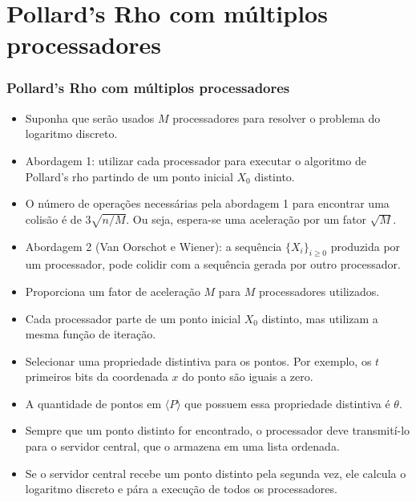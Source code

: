 \documentclass{beamer}
\begin{document}
\section{Pollard's Rho com múltiplos processadores}
\begin{frame}
\frametitle{Pollard's Rho com múltiplos processadores}
  \begin{itemize}
    \item Suponha que serão usados $M$ processadores para resolver o problema do logaritmo discreto.
    \item Abordagem 1: utilizar cada processador para executar o algoritmo de Pollard's rho partindo de um ponto inicial $X_0$ distinto.
    \item O número de operações necessárias pela abordagem 1 para encontrar uma colisão é de $3\sqrt{n/M}$. Ou seja, espera-se uma aceleração por um fator $\sqrt{M}$.
  \end{itemize}
\end{frame}
\begin{frame}
  \begin{itemize}
    \item Abordagem 2 (Van Oorschot e Wiener): a sequência $\{X_i\}_{i \geq 0}$ produzida por um processador, pode colidir com a sequência gerada por outro processador.
    \item Proporciona um fator de aceleração $M$ para $M$ processadores utilizados.
    \item Cada processador parte de um ponto inicial $X_0$ distinto, mas utilizam a mesma função de iteração.
  \end{itemize}
\end{frame}
\begin{frame}
  \begin{itemize}
    \item Selecionar uma propriedade distintiva para os pontos. Por exemplo, os $t$ primeiros bits da coordenada $x$ do ponto são iguais a zero.
    \item A quantidade de pontos em $\langle P \rangle$ que possuem essa propriedade distintiva é $\theta$.
    \item Sempre que um ponto distinto for encontrado, o processador deve transmití-lo para o servidor central, que o armazena em uma lista ordenada.
    \item Se o servidor central recebe um ponto distinto pela segunda vez, ele calcula o logaritmo discreto e pára a execução de todos os processadores.
  \end{itemize}
\end{frame}
\end{document}
